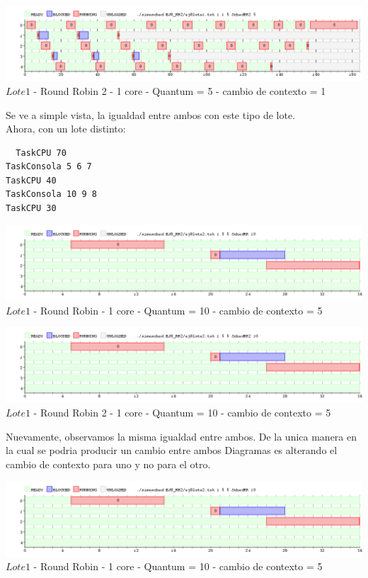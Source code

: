  \begin{center}
    	\includegraphics[width=450pt]{./EJ8_RR2/dif1corerr2.png}
	{$Lote 1$ - Round Robin 2 - 1 core - Quantum = 5 - cambio de contexto = 1}	
 \end{center}
 
 \indent Se ve a simple vista, la igualdad entre ambos con este tipo de lote.\\
 
 \indent Ahora, con un lote distinto:
 
 \begin{verbatim}
  TaskCPU 70
TaskConsola 5 6 7
TaskCPU 40
TaskConsola 10 9 8
TaskCPU 30
 \end{verbatim}
 
   \begin{center}
    	\includegraphics[width=450pt]{./EJ8_RR2/dif2corerr.png}
	{$Lote 1$ - Round Robin - 1 core - Quantum = 10 - cambio de contexto = 5}	
 \end{center}
 
 \begin{center}
    	\includegraphics[width=450pt]{./EJ8_RR2/dif2corerr2.png}
	{$Lote 1$ - Round Robin 2 - 1 core - Quantum = 10 - cambio de contexto = 5}	
 \end{center}
 
 \indent Nuevamente, observamos la misma igualdad entre ambos. De la unica manera en la cual se podria producir un cambio
 entre ambos Diagramas es alterando el cambio de contexto para uno y no para el otro.
 
 \begin{center}
    	\includegraphics[width=450pt]{./EJ8_RR2/dif3corerr.png}
	{$Lote 1$ - Round Robin - 1 core - Quantum = 10 - cambio de contexto = 5}	
 \end{center}
 
